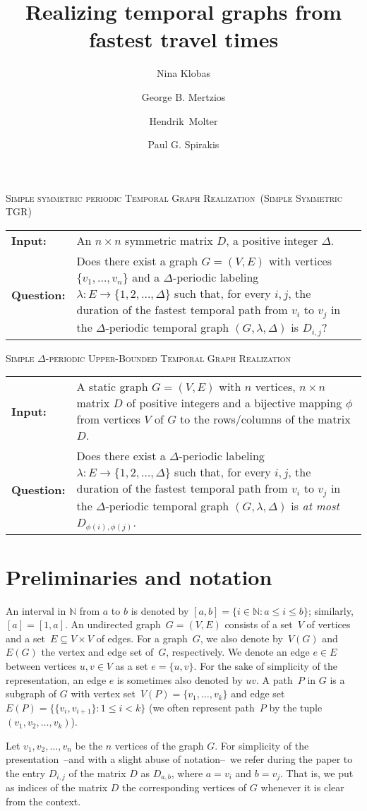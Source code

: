 \documentclass[a4paper,UKenglish,cleveref, autoref, thm-restate]{lipics-v2021}
\title{Realizing temporal graphs from fastest travel times} %
\author{Nina Klobas}{Department of Computer Science, Durham University, UK}{nina.klobas@durham.ac.uk}{ https://orcid.org/0000-0002-8024-5782}{}
\author{George B. Mertzios}{Department of Computer Science, Durham University, UK}{george.mertzios@durham.ac.uk}{https://orcid.org/0000-0001-7182-585X}{Supported by the EPSRC grant EP/P020372/1.}
\author{Hendrik~Molter}{Department of Computer Science, Ben-Gurion~University~of~the~Negev, 
	Beer-Sheva, 
	Israel}{molterh@post.bgu.ac.il}{https://orcid.org/0000-0002-4590-798X}{Supported by the ISF, grant No.~1456/18, and the ERC, grant number 949707.}
\author{Paul G. Spirakis}{Department of Computer Science, University of Liverpool, UK}{p.spirakis@liverpool.ac.uk}{https://orcid.org/0000-0001-5396-3749}{Supported by the EPSRC grant EP/P02002X/1.}
\makeatletter
\newcommand{\problemdef}[3]{
	\begin{center}
		\begin{minipage}{0.95\textwidth}
			\noindent
			#1
			\vspace{5pt}\\
			\setlength{\tabcolsep}{3pt}
			\begin{tabularx}{\textwidth}{@{}lX@{}}
				\textbf{Input:}& #2 \\
				\textbf{Question:}& #3
			\end{tabularx}
		\end{minipage}
	\end{center}
}
\newcommand{\deltaSymExactLong}{\textsc{Simple symmetric periodic Temporal Graph Realization}}
\newcommand{\deltaSymExact}{\textsc{Simple Symmetric TGR}}
\newcommand{\kDeltaUpperBoundLong}{\textsc{Simple $\Delta$-periodic Upper-Bounded Temporal Graph Realization}}
\makeatother
\begin{document}
	\maketitle
	
\problemdef{\deltaSymExactLong\ (\deltaSymExact)}
{An $n \times n$ symmetric matrix $D$, a positive integer $\Delta$.}
{Does there exist a graph $G=(V,E)$ with vertices $\{v_1,\ldots,v_{n}\}$ 
	and a $\Delta$-periodic labeling $\lambda: E \rightarrow \{1,2,\ldots,\Delta\}$ such that, 
	for every $i,j$, the duration of the fastest temporal path from $v_i$ to $v_j$ in the $\Delta$-periodic temporal graph $(G,\lambda,\Delta)$ is $D_{i,j}$?}
	
\problemdef{\kDeltaUpperBoundLong}
{A static graph $G=(V,E)$ with $n$ vertices, $n \times n$ matrix $D$ of positive integers and a bijective mapping $\phi$ from vertices $V$ of $G$ to the rows/columns of the matrix $D$.}
{Does there exist a $\Delta$-periodic labeling $\lambda: E \rightarrow \{1,2,\ldots,\Delta\}$ such that, 
	for every $i,j$, the duration of the fastest temporal path from $v_i$ to $v_j$ in the $\Delta$-periodic temporal graph $(G,\lambda,\Delta)$ is \emph{at most} $D_{\phi(i),\phi(j)}$.}

\section{Preliminaries and notation}

An interval in $\mathbb N$ from $a$ to $b$ is denoted by $[a,b] = \{ i\in \mathbb N  :  a \leq i \leq b\}$; similarly, $[a] = [1,a]$.
An undirected graph~$G=(V,E)$ consists of a set~$V$ of vertices 
and a set~$E \subseteq V \times V$ of edges.
For a graph~$G$, we also denote by~$V(G)$ and~$E(G)$ the vertex and edge set of~$G$, respectively.
We denote an edge $e \in E$ between vertices $u,v \in V$ as a set $e=\{u,v\}$.
For the sake of simplicity of the representation, an edge $e$ is sometimes also denoted by $uv$. 
A path~$P$ in $G$ is a subgraph of $G$ with vertex set~$V(P)=\{v_1,\dots,v_k\}$ and edge set~$E(P)=\{\{v_i,v_{i+1}\} :  1\leq i<k\}$
(we often represent path~$P$ by the tuple~$(v_1,v_2,\dots,v_k)$).

Let $v_1,v_2,\ldots,v_n$ be the $n$ vertices of the graph $G$. 
For simplicity of the presentation~--and with a slight abuse of notation--~we refer during the paper to the entry $D_{i,j}$ of the matrix $D$ as 
$D_{a,b}$, where $a=v_i$ and $b=v_j$. That is, we put as indices of the matrix $D$ the corresponding vertices of $G$ whenever it is clear from the context.
\end{document}

